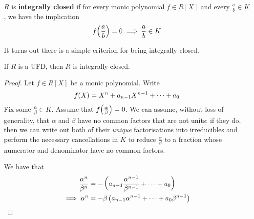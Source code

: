 \begin{boxdefinition}
    $R$ is \textbf{integrally closed} if for every monic polynomial $f \in R[X]$ and every $\frac{a}{b} \in K$, we have the implication
    \begin{align*}
        f\!\left( \frac{a}{b} \right) = 0 \implies \frac{a}{b} \in K
    \end{align*}
\end{boxdefinition}

It turns out there is a simple criterion for being integrally closed.

\begin{boxproposition}
    If $R$ is a UFD, then $R$ is integrally closed.
\end{boxproposition}
\begin{proof}
    Let $f \in R[X]$ be a monic polynomial. Write
    \begin{align*}
        f\!\left( X \right) = X^n + a_{n-1} X^{n-1} + \cdots + a_0
    \end{align*}
    Fix some $\frac{\alpha}{\beta} \in K$. Assume that $f\!\left( \frac{\alpha}{\beta} \right) = 0$. We can assume, without loss of generality, that $\alpha$ and $\beta$ have no common factors that are not units: if they do, then we can write out both of their \textit{unique} factorisations into irreducibles and perform the necessary cancellations in $K$ to reduce $\frac{\alpha}{\beta}$ to a fraction whose numerator and denominator have no common factors.

    We have that
    \begin{align*}
        \frac{\alpha^n}{\beta^n} &= -\left( a_{n-1}\frac{\alpha^{n-1}}{\beta^{n-1}} + \cdots + a_0 \right) \\
        \implies \alpha^n &= -\beta\left( a_{n-1}\alpha^{n-1} + \cdots + a_0 \beta^{n-1} \right)
    \end{align*}
\end{proof}